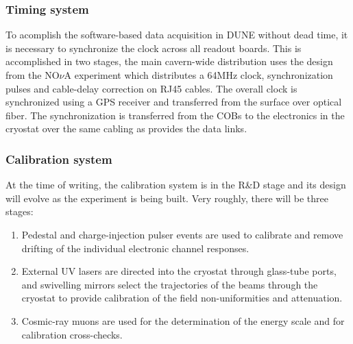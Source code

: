\subsubsection{Timing system}
To acomplish the software-based data acquisition in DUNE without dead time, it is
necessary to synchronize the clock across all readout boards.  This is accomplished
in two stages, the main cavern-wide distribution uses the design from the NO$\nu$A
experiment which distributes a 64MHz clock, synchronization pulses and
cable-delay correction on RJ45 cables.  The overall clock is
synchronized using a GPS receiver and transferred from the surface
over optical fiber.  The synchronization is transferred from the COBs
to the electronics in the cryostat over the same cabling as provides
the data links.

\subsubsection{Calibration system}
At the time of writing, the calibration system is in the R\&D stage and its design will
evolve as the experiment is being built. Very roughly, there will be three stages:
\begin{enumerate}

\item Pedestal and charge-injection pulser events are used to calibrate and
remove drifting of the individual electronic channel responses.

\item External UV lasers are directed into the cryostat through glass-tube
ports, and swivelling mirrors select the trajectories of the beams
through the cryostat to provide calibration of the field
non-uniformities and attenuation.

\item Cosmic-ray muons are used for the determination of the energy scale and for calibration
cross-checks.

\end{enumerate}



